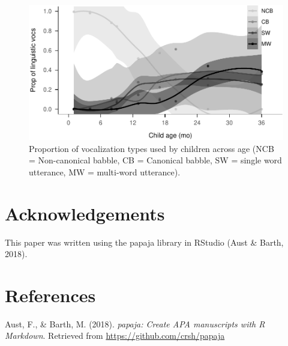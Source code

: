 \documentclass[,man,floatsintext]{apa6}
\begin{document}
\begin{figure}
\centering
\includegraphics{Yeli-CLE_files/figure-latex/fig6-1.pdf}
\caption{\label{fig:fig6}Proportion of vocalization types used by children
across age (NCB = Non-canonical babble, CB = Canonical babble, SW =
single word utterance, MW = multi-word utterance).}
\end{figure}

\section{Acknowledgements}\label{acknowledgements}

This paper was written using the papaja library in RStudio (Aust \&
Barth, 2018).

\newpage

\section{References}\label{refs}

\begingroup
\setlength{\parindent}{-0.5in} \setlength{\leftskip}{0.5in}

\hypertarget{refs}{}
\hypertarget{ref-R-papaja}{}
Aust, F., \& Barth, M. (2018). \emph{papaja: Create APA manuscripts with
R Markdown}. Retrieved from \url{https://github.com/crsh/papaja}

\endgroup
\end{document}
